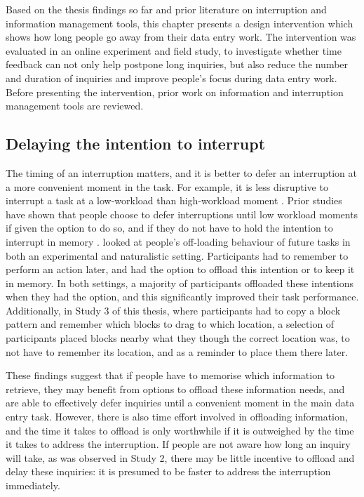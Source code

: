 Based on the thesis findings so far and prior literature on interruption and information management tools, this chapter presents a design intervention which shows how long people go away from their data entry work. The intervention was evaluated in an online experiment and field study, to investigate whether time feedback can not only help postpone long inquiries, but also reduce the number and duration of inquiries and improve people’s focus during data entry work. Before presenting the intervention, prior work on information and interruption management tools are reviewed. 

\subsection{Delaying the intention to interrupt}
The timing of an interruption matters, and it is better to defer an interruption at a more convenient moment in the task. For example, it is less disruptive to interrupt a task at a low-workload than high-workload moment \citep{Gould2013a, Iqbal2005}. Prior studies have shown that people choose to defer interruptions until low workload moments if given the option to do so, and if they do not have to hold the intention to interrupt in memory \citep{Gilbert2015, Salvucci2010}. \citet{Gilbert2015} looked at people’s off-loading behaviour of future tasks in both an experimental and naturalistic setting. Participants had to remember to perform an action later, and had the option to offload this intention or to keep it in memory. In both settings, a majority of participants offloaded these intentions when they had the option, and this significantly improved their task performance. Additionally, in Study 3 of this thesis, where participants had to copy a block pattern and remember which blocks to drag to which location, a selection of participants placed blocks nearby what they though the correct location was, to not have to remember its location, and as a reminder to place them there later. 

These findings suggest that if people have to memorise which information to retrieve, they may benefit from options to offload these information needs, and are able to effectively defer inquiries until a convenient moment in the main data entry task. However, there is also time effort involved in offloading information, and the time it takes to offload is only worthwhile if it is outweighed by the time it takes to address the interruption. If people are not aware how long an inquiry will take, as was observed in Study 2, there may be little incentive to offload and delay these inquiries: it is presumed to be faster to address the interruption immediately.

